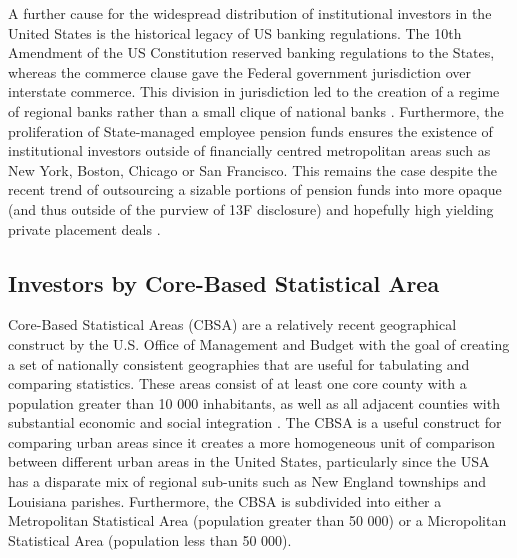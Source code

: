 A further cause for the widespread distribution of institutional investors in the United States is the historical legacy of US banking regulations.  The 10th Amendment of the US Constitution reserved banking regulations to the States, whereas the commerce clause gave the Federal government jurisdiction over interstate commerce.  This division in jurisdiction led to the creation of a regime of regional banks rather than a small clique of national banks \citep{Calomiris2000}. Furthermore, the proliferation of State-managed employee pension funds ensures the existence of institutional investors outside of financially centred metropolitan areas such as New York, Boston, Chicago or San Francisco.  This remains the case despite the recent trend of outsourcing a sizable portions of pension funds into more opaque (and thus outside of the purview of 13F disclosure) and hopefully high yielding private placement deals \cite{lerner2019investing}. 




\subsection{Investors by Core-Based Statistical Area}


Core-Based Statistical Areas (CBSA) are a relatively recent geographical construct by the U.S. Office of Management and Budget with the goal of creating a set of nationally consistent geographies that are useful for tabulating and comparing statistics.  These areas consist of at least one core county with a population greater than 10 000 inhabitants, as well as all adjacent counties with substantial economic and social integration \citep{USCensusCBSAdef}.  The CBSA is a useful construct for comparing urban areas since it creates a more homogeneous unit of comparison between different urban areas in the United States, particularly since the USA has a disparate mix of regional sub-units such as New England townships and Louisiana parishes.  Furthermore, the CBSA is subdivided into either a Metropolitan Statistical Area (population greater than 50 000) or a Micropolitan Statistical Area (population less than 50 000).  

